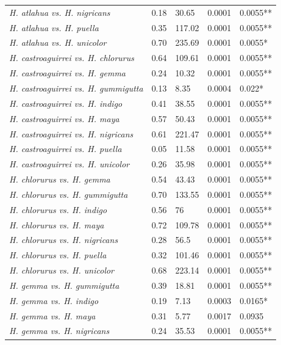 \begin{xltabular}{\textwidth}{p{5cm}*{4}{X}}
    \emph{H. atlahua vs. H. nigricans} & 0.18 & 30.65 & 0.0001 & 0.0055** \\
    \emph{H. atlahua vs. H. puella} & 0.35 & 117.02 & 0.0001 & 0.0055** \\
    \emph{H. atlahua vs. H. unicolor} & 0.70 & 235.69 & 0.0001 & 0.0055* \\
    \emph{H. castroaguirrei vs. H. chlorurus} & 0.64 & 109.61 & 0.0001 & 0.0055** \\ 
    \emph{H. castroaguirrei vs. H. gemma} & 0.24 & 10.32 & 0.0001 & 0.0055** \\ 
    \emph{H. castroaguirrei vs. H. gummigutta} & 0.13 & 8.35 & 0.0004 & 0.022* \\ 
    \emph{H. castroaguirrei vs. H. indigo} & 0.41 & 38.55 & 0.0001 & 0.0055** \\ 
    \emph{H. castroaguirrei vs. H. maya} & 0.57 & 50.43 & 0.0001 & 0.0055** \\ 
    \emph{H. castroaguirrei vs. H. nigricans} & 0.61 & 221.47 & 0.0001 & 0.0055** \\ 
    \emph{H. castroaguirrei vs. H. puella} & 0.05 & 11.58 & 0.0001 & 0.0055** \\ 
    \emph{H. castroaguirrei vs. H. unicolor} & 0.26 & 35.98 & 0.0001 & 0.0055** \\ 
    \emph{H. chlorurus vs. H. gemma} & 0.54 & 43.43 & 0.0001 & 0.0055** \\ 
    \emph{H. chlorurus vs. H. gummigutta} & 0.70 & 133.55 & 0.0001 & 0.0055** \\ 
    \emph{H. chlorurus vs. H. indigo} & 0.56 & 76 & 0.0001 & 0.0055** \\ 
    \emph{H. chlorurus vs. H. maya} & 0.72 & 109.78 & 0.0001 & 0.0055** \\ 
    \emph{H. chlorurus vs. H. nigricans} & 0.28 & 56.5 & 0.0001 & 0.0055** \\
    \emph{H. chlorurus vs. H. puella} & 0.32 & 101.46 & 0.0001 & 0.0055** \\ 
    \emph{H. chlorurus vs. H. unicolor} & 0.68 & 223.14 & 0.0001 & 0.0055** \\
    \emph{H. gemma vs. H. gummigutta} & 0.39 & 18.81 & 0.0001 & 0.0055** \\
    \emph{H. gemma vs. H. indigo} & 0.19 & 7.13 & 0.0003 & 0.0165* \\
    \emph{H. gemma vs. H. maya} & 0.31 & 5.77 & 0.0017 & 0.0935 \\
    \emph{H. gemma vs. H. nigricans} & 0.24 & 35.53 & 0.0001 & 0.0055** \\

\end{xltabular}
